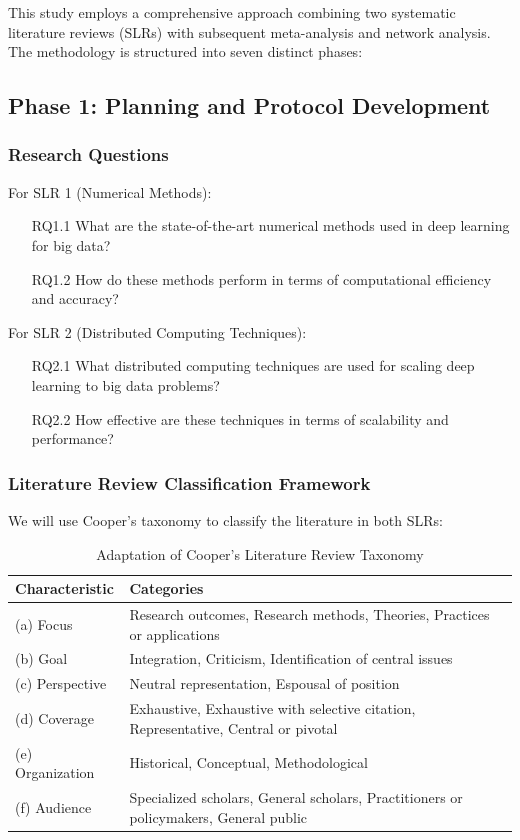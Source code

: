 \documentclass[a4paper,12pt]{article}
\begin{document}
This study employs a comprehensive approach combining two systematic literature reviews (SLRs) with subsequent meta-analysis and network analysis. The methodology is structured into seven distinct phases:

\subsection{Phase 1: Planning and Protocol Development}

\subsubsection{Research Questions}
For SLR 1 (Numerical Methods):
\begin{enumerate}
    \item[RQ1.1] What are the state-of-the-art numerical methods used in deep learning for big data?
    \item[RQ1.2] How do these methods perform in terms of computational efficiency and accuracy?
\end{enumerate}

For SLR 2 (Distributed Computing Techniques):
\begin{enumerate}
    \item[RQ2.1] What distributed computing techniques are used for scaling deep learning to big data problems?
    \item[RQ2.2] How effective are these techniques in terms of scalability and performance?
\end{enumerate}

\subsubsection{Literature Review Classification Framework}
We will use Cooper's taxonomy \citep{cooper1988} to classify the literature in both SLRs:

\begin{table}[h]
\caption{Adaptation of Cooper's Literature Review Taxonomy}
\begin{tabularx}{\textwidth}{lX}
\toprule
Characteristic & Categories \\
\midrule
(a) Focus     & Research outcomes, Research methods, Theories, Practices or applications \\
(b) Goal      & Integration, Criticism, Identification of central issues \\
(c) Perspective & Neutral representation, Espousal of position \\
(d) Coverage  & Exhaustive, Exhaustive with selective citation, Representative, Central or pivotal \\
(e) Organization & Historical, Conceptual, Methodological \\
(f) Audience  & Specialized scholars, General scholars, Practitioners or policymakers, General public \\
\bottomrule
\end{tabularx}
\end{table}
\end{document}
